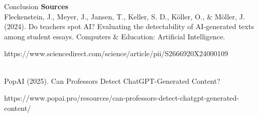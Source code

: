 \documentclass[14pt, aspectratio=169]{beamer}
\begin{document}
\begin{frame}{Conclusion}
  \textbf{Sources}\\
    Fleckenstein, J., Meyer, J., Jansen, T., Keller, S. D., Köller, O., \& Möller, J. (2024). Do teachers spot AI? Evaluating the detectability of AI-generated texts among student essays. Computers \& Education: Artificial Intelligence.
    \begin{tiny}
    https://www.sciencedirect.com/science/article/pii/S2666920X24000109
    \end{tiny}\\
    \vspace{0.2cm}
    PopAI (2025). Can Professors Detect ChatGPT-Generated Content?\\
    \begin{tiny}
    https://www.popai.pro/resources/can-professors-detect-chatgpt-generated-content/
    \end{tiny}\\
\end{frame}





\end{document}
